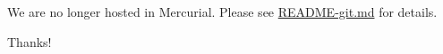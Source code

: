 We are no longer hosted in Mercurial. Please see \mbox{\hyperlink{_r_e_a_d_m_e-git_8md}{README-\/git.\+md}} for details.

Thanks! 